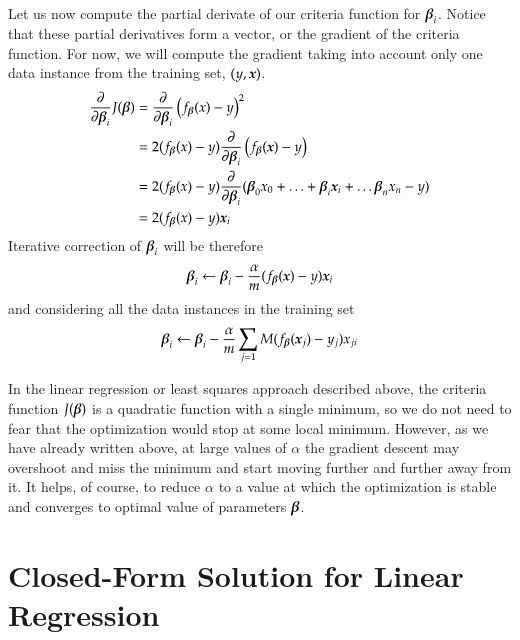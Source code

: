 \begin{refsection}
Let us now compute the partial derivate of our criteria function for $\boldsymbol{\beta}_i$. Notice that these partial derivatives form a vector, or the gradient of the criteria function. For now, we will compute the gradient taking into account only one data instance from the training set, $(y, \boldsymbol{x})$. 
%
\begin{align}
{\partial\over\partial\boldsymbol{\beta}_i} J(\boldsymbol{\beta}) & = 
{\partial\over\partial\boldsymbol{\beta}_i} \left(f_{\boldsymbol{\beta}}(x)-y\right)^2 \\
& = 2(f_{\boldsymbol{\beta}}(x)-y){\partial\over\partial\boldsymbol{\beta}_i}\left(f_{\boldsymbol{\beta}}(\boldsymbol{x})-y\right) \\
& = 2 (f_{\boldsymbol{\beta}}(x)-y){\partial\over\partial\boldsymbol{\beta}_i}(\boldsymbol{\beta}_0 x_0 + \ldots + \boldsymbol{\beta}_i \boldsymbol{x}_i + \ldots \boldsymbol{\beta}_n x_n - y) \\
& = 2 (f_{\boldsymbol{\beta}}(x)-y)\boldsymbol{x}_i
\end{align}
%
Iterative correction of $\boldsymbol{\beta}_i$ will be therefore
\begin{equation}
  \boldsymbol{\beta}_i\leftarrow\boldsymbol{\beta}_i-{\alpha\over m}(f_{\boldsymbol{\beta}}(\boldsymbol{x})-y) \boldsymbol{x}_i
\end{equation}
and considering all the data instances in the training set
\begin{equation}
  \boldsymbol{\beta}_i\leftarrow\boldsymbol{\beta}_i-{\alpha\over m}\sum_{j=1}M(f_{\boldsymbol{\beta}}(\boldsymbol{x}_j)-y_j)x_{ji}
\end{equation}

In the linear regression or least squares approach described above, the criteria function $J(\boldsymbol{\beta})$ is a quadratic function with a single minimum, so we do not need to fear that the optimization would stop at some local minimum. However, as we have already written above, at large values of $\alpha$ the gradient descent may overshoot and miss the minimum and start moving further and further away from it. It helps, of course, to reduce $\alpha$ to a value at which the optimization is stable and converges to optimal value of parameters $\boldsymbol{\beta}$.

\section{Closed-Form Solution for Linear Regression}


\end{refsection}
